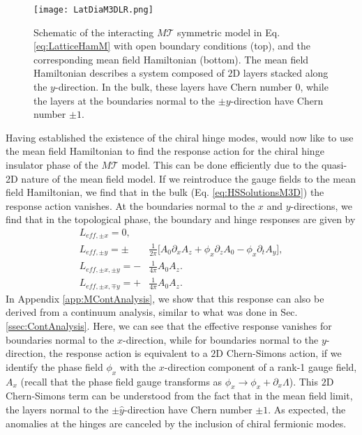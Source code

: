 \documentclass[prb,aps,twocolumn,groupaddress,floatfix]{revtex4-1}
\begin{document}
\begin{figure}\centering
\texttt{[image: LatDiaM3DLR.png]}
\caption{Schematic of the interacting $M\mathcal{T}$ symmetric model in Eq. \ref{eq:LatticeHamM} with open boundary conditions (top), and the corresponding mean field Hamiltonian (bottom). The mean field Hamiltonian describes a system composed of $2$D layers stacked along the $y$-direction. In the bulk, these layers have Chern number $0$, while the layers at the boundaries normal to the $\pm y$-direction have Chern number $\pm 1$.}\label{fig:LatDiaM1}
\end{figure}

Having established the existence of the chiral hinge modes, would now like to use the mean field Hamiltonian to find the response action for the chiral hinge insulator phase of the $M\mathcal{T}$ model. This can be done efficiently due to the quasi-2D nature of the mean field model. If we reintroduce the gauge fields to the mean field Hamiltonian, we find that in the bulk (Eq. \ref{eq:HSSolutionsM3D}) the response action vanishes. At the boundaries normal to the $x$ and $y$-directions, we find that in the topological phase, the boundary and hinge responses are given by
\begin{equation}
\begin{split}
L_{eff,\pm x} = 0,\\
L_{eff,\pm y} =\pm & \frac{1}{2\pi}\big[ A_0 \partial_x A_z + \phi_x \partial_z A_0 - \phi_x\partial_t A_y \big],\\
L_{eff,\pm x , \pm y} =- & \frac{1}{4\pi} A_0A_z. \\
L_{eff,\pm x, \mp y} = + & \frac{1}{4\pi} A_0A_z.
\end{split}\label{eq:EffectiveActionBoundM}
\end{equation}
In Appendix \ref{app:MContAnalysis}, we show that this response can also be derived from a continuum analysis, similar to what was done in Sec. \ref{ssec:ContAnalysis}. Here, we can see that the effective response vanishes for boundaries normal to the $x$-direction, while for boundaries normal to the $y$-direction, the response action is equivalent to a $2$D Chern-Simons action, if we identify the phase field $\phi_x$ with the $x$-direction component of a rank-1 gauge field, $A_x$ (recall that the phase field gauge transforms as $\phi_x \rightarrow \phi_x + \partial_x \Lambda$). This $2$D Chern-Simons term can be understood from the fact that in the mean field limit, the layers normal to the $\pm \hat{y}$-direction have Chern number $\pm 1$. As expected, the anomalies at the hinges are  canceled by the inclusion of chiral fermionic modes. 
\end{document}
